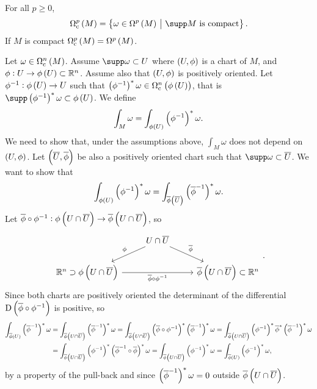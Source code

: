 
\begin{notation}
For all $ p \ge 0 $,
$$ \Omega_\c^p\br{M} = \cbr{\omega \in \Omega^p\br{M} \st \supp M \ \text{is compact}}. $$
If $ M $ is compact $ \Omega_\c^p\br{M} = \Omega^p\br{M} $.
\end{notation}

Let $ \omega \in \Omega_\c^n\br{M} $. Assume $ \supp \omega \subset U $ where $ \br{U, \phi} $ is a chart of $ M $, and $ \phi : U \to \phi\br{U} \subset \RR^n $. Assume also that $ \br{U, \phi} $ is positively oriented. Let $ \phi^{-1} : \phi\br{U} \to U $ such that $ \br{\phi^{-1}}^*\omega \in \Omega_\c^n\br{\phi\br{U}} $, that is $ \supp \br{\phi^{-1}}^*\omega \subset \phi\br{U} $. We define
\begin{equation}
\label{eq:1}
\int_M \omega = \int_{\phi\br{U}} \br{\phi^{-1}}^*\omega.
\end{equation}
We need to show that, under the assumptions above, $ \int_M \omega $ does not depend on $ \br{U, \phi} $. Let $ \br{\overline{U}, \overline{\phi}} $ be also a positively oriented chart such that $ \supp \omega \subset \overline{U} $. We want to show that
$$ \int_{\phi\br{U}} \br{\phi^{-1}}^*\omega = \int_{\overline{\phi}\br{\overline{U}}} \br{\overline{\phi}^{-1}}^*\omega. $$
Let $ \overline{\phi} \circ \phi^{-1} : \phi\br{U \cap \overline{U}} \to \overline{\phi}\br{U \cap \overline{U}} $, so
$$
\begin{tikzcd}
& U \cap \overline{U} \arrow[swap]{dl}{\phi} \arrow{dr}{\overline{\phi}} & \\
\RR^n \supset \phi\br{U \cap \overline{U}} \arrow[swap]{rr}{\overline{\phi} \circ \phi^{-1}} & & \overline{\phi}\br{U \cap \overline{U}} \subset \RR^n
\end{tikzcd}.
$$
Since both charts are positively oriented the determinant of the differential $ \D\br{\overline{\phi} \circ \phi^{-1}} $ is positive, so
\begin{align*}
\int_{\overline{\phi}\br{U}} \br{\overline{\phi}^{-1}}^*\omega
& = \int_{\overline{\phi}\br{U \cap \overline{U}}} \br{\overline{\phi}^{-1}}^*\omega
= \int_{\overline{\phi}\br{U \cap \overline{U}}} \br{\overline{\phi} \circ \phi^{-1}}^*\br{\overline{\phi}^{-1}}^*\omega
= \int_{\overline{\phi}\br{U \cap \overline{U}}} \br{\phi^{-1}}^*\overline{\phi}^*\br{\overline{\phi}^{-1}}^*\omega \\
& = \int_{\overline{\phi}\br{U \cap \overline{U}}} \br{\phi^{-1}}^*\br{\overline{\phi}^{-1} \circ \overline{\phi}}^*\omega
= \int_{\overline{\phi}\br{U \cap \overline{U}}} \br{\phi^{-1}}^*\omega
= \int_{\overline{\phi}\br{U}} \br{\phi^{-1}}^*\omega,
\end{align*}
by a property of the pull-back and since $ \br{\overline{\phi}^{-1}}^*\omega = 0 $ outside $ \overline{\phi}\br{U \cap \overline{U}} $.

